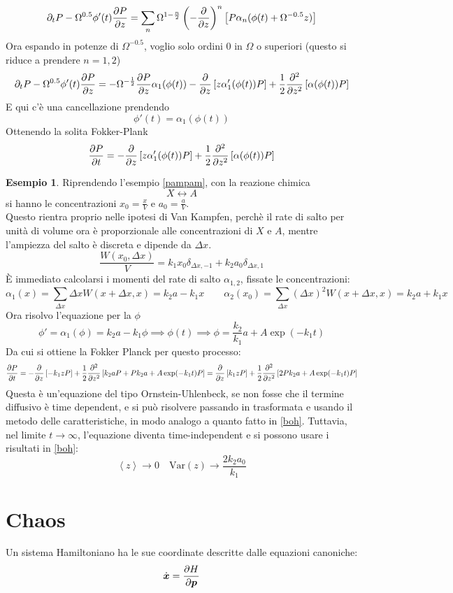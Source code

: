 \documentclass[a4paper,12pt]{article}
\theoremstyle{plain}
\renewcommand{\vec}[1]{{\boldsymbol{#1}}}
\theoremstyle{definition}
\newtheorem{exmp}{Esempio}[section]
\newcommand{\f}[2]{\frac{#1}{#2}}
\newcommand{\ave}[1]{\left\langle#1\right\rangle }
\newcommand{\tdv}{\partial_t}
\newcommand{\Var}{\mathrm{Var}}
\newcommand{\mom}{\vec{p}}
\newcommand{\ra}{\rightarrow}
\theoremstyle{remark}
\begin{document}
\[\tdv{P}-\Omega^{0.5}\phi'(t)		\pdv{P}{z}=\sum_n 	\Omega^{1-\f{n}{2}}\left(-\pdv{z}\right)^n	\left[P\alpha_n(\phi(t)+\Omega^{-0.5}z	)	\right]\]
Ora espando in potenze di $\Omega^{-0.5}$, voglio solo ordini $0$ in $\Omega$ o superiori (questo si riduce  a prendere $n=1,2$)
\[\tdv{P}-\Omega^{0.5}\phi'(t)		\pdv{P}{z}=	-\Omega^{-\f{1}{2}}\pdv{P}{z}	\alpha_1(\phi(t)	)-\pdv{z}\left[z\alpha'_1(\phi(t))P\right]+\f{1}{2}\pdv[2]{z}\left[\alpha(\phi(t))P\right]\]
E qui c'è una cancellazione prendendo 
\[\phi'(t)=\alpha_1(\phi(t))\]
Ottenendo la solita Fokker-Plank
\[\pdv{P}{t}=-\pdv{z}\left[z\alpha'_1(\phi(t))P\right]+\f{1}{2}\pdv[2]{z}\left[\alpha(\phi(t))P\right]\]
\begin{exmp}
Riprendendo l'esempio \ref{pampam}, con la reazione chimica
\[X\leftrightarrow A\]
si hanno le concentrazioni $x_0=\f{x}{V}$ e $a_0=\f{a}{V}$.
\\Questo rientra proprio nelle ipotesi di Van Kampfen, perchè il rate di salto per unità di volume ora è proporzionale alle concentrazioni di $X$ e $A$, mentre l'ampiezza del salto è discreta e dipende da $\Delta x$.
\[\f{W(x_0,\Delta x)}{V}=k_1 x_0\delta_{\Delta x,-1}+	k_2 a_0 \delta_{\Delta x,1}		\]
È  immediato calcolarsi i momenti del rate di salto  $\alpha_{1,2}$, fissate le concentrazioni:
\[\alpha_1(x)=\sum_{\Delta x}\Delta x W(x+ \Delta x, x)=k_2 a-k_1 x\quad\quad\alpha_2(x_0)=\sum_{\Delta x}\left(\Delta x\right)^2W(x+ \Delta x, x)=k_2 a+k_1 x\]
Ora risolvo l'equazione per la $\phi$
\[\phi'	=\alpha_1(\phi)= k_2 a-k_1 \phi\implies\phi(t)\implies	\phi=\f{k_2}{k_1}a	+A\exp(-k_1 t)	\]
Da cui si ottiene la Fokker Planck per questo processo:
\[\pdv{P}{t}=-\pdv{z}\left[-k_1zP\right]+\f{1}{2}\pdv[2]{z}\left[k_2 aP+P k_2 a +A \exp(-k_1 t)P\right]=\pdv{z}\left[k_1zP\right]+\f{1}{2}\pdv[2]{z}\left[2P k_2 a +A \exp(-k_1 t)P\right]\]
Questa è un'equazione del tipo Ornstein-Uhlenbeck, se non fosse che il termine diffusivo è time dependent, e si può risolvere passando in trasformata e usando il metodo delle caratteristiche, in modo analogo a quanto fatto in \ref{boh}. Tuttavia, nel limite $t\ra \infty$, l'equazione diventa time-independent e si possono usare i risultati in \ref{boh}:
\[\ave{z}\ra0\quad 	\Var{(z)}\ra\f{2 k_2a_0}{k_1}	\]
\end{exmp}

\part{Chaos}
Un sistema Hamiltoniano ha le sue coordinate descritte dalle equazioni canoniche:
\[\dot{\vec{x}}=\pdv{H}{\mom}			\]
\end{document}
